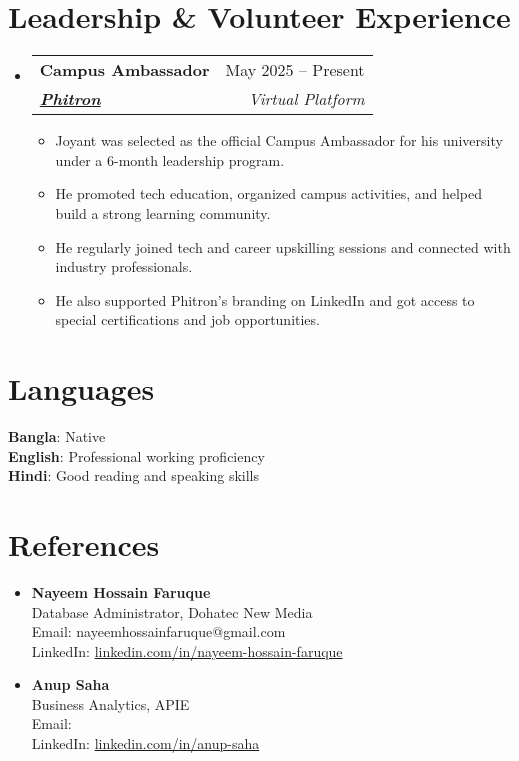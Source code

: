 \documentclass[a4paper, 11pt]{article}
\newcommand{\resumeItem}[1]{
  \item\small{
    {#1 \vspace{-2pt}}
  }
}
\newcommand{\resumeSubheading}[5]{
  \vspace{-2pt}\item
    \begin{tabularx}{\textwidth}[t]{X r}
      \textbf{#1} & #2 \\
      \textbf{\textit{\href{#3}{\small #4}}} & \textit{\small #5} \\
    \end{tabularx}\vspace{-7pt}
}
\newcommand{\resumeSubHeadingListStart}{\begin{itemize}[leftmargin=0in, label={}]}
\newcommand{\resumeSubHeadingListEnd}{\end{itemize}}
\newcommand{\resumeItemListStart}{\begin{itemize}}
\newcommand{\resumeItemListEnd}{\end{itemize}\vspace{-5pt}}
\begin{document}
\section{\textbf{Leadership \& Volunteer Experience}}
    \resumeSubHeadingListStart
        \resumeSubheading
            {Campus Ambassador}{May 2025 -- Present}
            {https://phitron.io/}{Phitron}{Virtual Platform}
        \resumeItemListStart
            \resumeItem{Joyant was selected as the official Campus Ambassador for his university under a 6-month leadership program.}
            \resumeItem{He promoted tech education, organized campus activities, and helped build a strong learning community.}
            \resumeItem{He regularly joined tech and career upskilling sessions and connected with industry professionals.}
            \resumeItem{He also supported Phitron’s branding on LinkedIn and got access to special certifications and job opportunities.}
        \resumeItemListEnd
    \resumeSubHeadingListEnd

\section{\textbf{Languages}}
  \begin{itemize}[leftmargin=0in, label={}]
    \small{\item{
      \textbf{Bangla}{: Native} \\
      \textbf{English}{: Professional working proficiency} \\
      \textbf{Hindi}{: Good reading and speaking skills}
    }}
  \end{itemize}

\section{\textbf{References}}
    \begin{itemize}[leftmargin=0in, label={}]
    \item \small{
        \textbf{Nayeem Hossain Faruque} \\
        Database Administrator, Dohatec New Media \\
        Email:  nayeemhossainfaruque@gmail.com \\
        LinkedIn:  \href{https://www.linkedin.com/in/nayeem-hossain-faruque-4a3865294/}{linkedin.com/in/nayeem-hossain-faruque}\\
    }
    \vspace{5pt}
    \item \small{
        \textbf{Anup Saha} \\
        Business Analytics, APIE \\
        Email:  \\
        LinkedIn: \href{https://www.linkedin.com/in/anup-saha-31589816a/}{linkedin.com/in/anup-saha} \\
    }
    \end{itemize}
\end{document}
